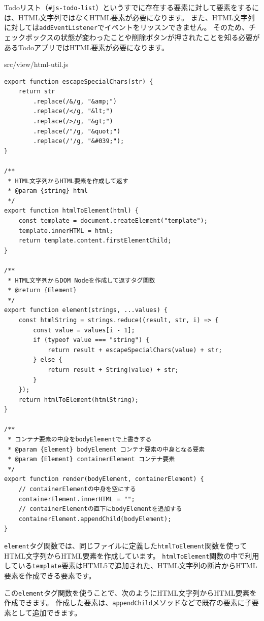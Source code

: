 Todoリスト（\texttt{\#js-todo-list}）というすでに存在する要素に対して要素を\textbf{}するには、HTML文字列ではなくHTML要素が必要になります。
また、HTML文字列に対しては\texttt{addEventListener}でイベントをリッスンできません。
そのため、チェックボックスの状態が変わったことや削除ボタンが押されたことを知る必要があるTodoアプリではHTML要素が必要になります。

\begin{listtitle}
src/view/html-util.js
\end{listtitle}
\begin{lstlisting}
export function escapeSpecialChars(str) {
    return str
        .replace(/&/g, "&amp;")
        .replace(/</g, "&lt;")
        .replace(/>/g, "&gt;")
        .replace(/"/g, "&quot;")
        .replace(/'/g, "&#039;");
}

/**
 * HTML文字列からHTML要素を作成して返す
 * @param {string} html 
 */
export function htmlToElement(html) {
    const template = document.createElement("template");
    template.innerHTML = html;
    return template.content.firstElementChild;
}

/**
 * HTML文字列からDOM Nodeを作成して返すタグ関数
 * @return {Element}
 */
export function element(strings, ...values) {
    const htmlString = strings.reduce((result, str, i) => {
        const value = values[i - 1];
        if (typeof value === "string") {
            return result + escapeSpecialChars(value) + str;
        } else {
            return result + String(value) + str;
        }
    });
    return htmlToElement(htmlString);
}

/**
 * コンテナ要素の中身をbodyElementで上書きする
 * @param {Element} bodyElement コンテナ要素の中身となる要素
 * @param {Element} containerElement コンテナ要素
 */
export function render(bodyElement, containerElement) {
    // containerElementの中身を空にする
    containerElement.innerHTML = "";
    // containerElementの直下にbodyElementを追加する
    containerElement.appendChild(bodyElement);
}
\end{lstlisting}
\listend

\texttt{element}タグ関数では、同じファイルに定義した\texttt{htmlToElement}関数を使ってHTML文字列からHTML要素を作成しています。
\texttt{htmlToElement}関数の中で利用している\href{https://developer.mozilla.org/ja/docs/Web/HTML/Element/template}{\texttt{template}要素}はHTML5で追加された、HTML文字列の断片からHTML要素を作成できる要素です。

この\texttt{element}タグ関数を使うことで、次のようにHTML文字列からHTML要素を作成できます。
作成した要素は、\texttt{appendChild}メソッドなどで既存の要素に子要素として追加できます。

